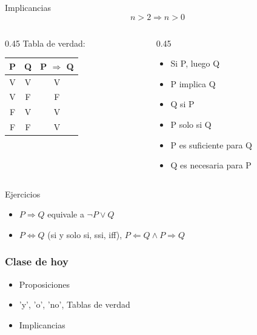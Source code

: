 \documentclass[14pt,aspectratio=169,xcolor=dvipsnames]{beamer}
\begin{document}
\begin{frame}{Implicancias}
    $$ n > 2 \Rightarrow n > 0 $$
    \begin{columns}
        \begin{column}{0.45\textwidth}
            Tabla de verdad:
            \begin{center}
                \begin{tabular}{c c | c}
                    \toprule P & Q & P $\Rightarrow$ Q \\\midrule
                    V & V & V \\
                    V & F & F \\
                    F & V & \alert{V} \\
                    F & F & V  \\ \bottomrule
                \end{tabular}
            \end{center}
        \end{column}
        \begin{column}{0.45\textwidth}
            \begin{itemize}
                \item Si P, luego Q
                \item P implica Q
                \item Q si P
                \item P solo si Q
                \item \alert{P es suficiente para Q}
                \item \alert{Q es necesaria para P}
            \end{itemize}
        \end{column}
    \end{columns}
\end{frame}
\begin{frame}{Ejercicios}
    \begin{itemize}
        \item $ P\Rightarrow Q$ equivale a $\neg P \vee Q$
        \item $ P\Leftrightarrow Q $  (si y solo si, ssi, iff), $ P \Leftarrow Q  \wedge P \Rightarrow Q  $ 
    \end{itemize}
\end{frame}
\begin{frame}\frametitle{Clase de hoy}
    \begin{itemize}
        \item Proposiciones
        \item 'y', 'o', 'no', Tablas de verdad
        \item Implicancias
    \end{itemize}

    \vspace{1cm}
\end{frame}
\begin{frame}
    \maketitle
\end{frame}
\end{document}
